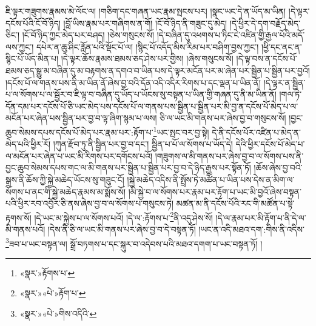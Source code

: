 ཇི་ལྟར་གཟུགས་རྣམས་མེ་ལོང་ལ། །གཅིག་དང་གཞན་ཡང་རྣམ་སྤངས་པར། །སྣང་ཡང་དེ་ན་ཡོད་མ་ཡིན། །དེ་ལྟར་དངོས་པོའི་ངོ་བོ་ཉིད། །བློ་ཡིས་རྣམ་པར་གཞིགས་ན་གོ། །ངོ་བོ་ཉིད་ནི་གཟུང་དུ་མེད། །དེ་ཕྱིར་དེ་དག་བརྗོད་མེད་ཅིང་། །ངོ་བོ་ཉིད་ཀྱང་མེད་པར་བཤད། །ཅེས་གསུངས་སོ། །དེ་བཞིན་དུ་འཕགས་པ་ཏིང་ངེ་འཛིན་གྱི་རྒྱལ་པོའི་མདོ་ལས་ཀྱང་། དཔེར་ན་ཆུ་ཤིང་རློན་པའི་སྡོང་པོ་ལ། །སྙིང་པོ་འདོད་མིས་རིམ་པར་བཤིག་བྱས་ཀྱང་། །ཕྱི་དང་ནང་ན་སྙིང་པོ་ཡོད་མིན་པ། །དེ་ལྟར་ཆོས་རྣམས་ཐམས་ཅད་ཤེས་པར་གྱིས། །ཞེས་གསུངས་སོ། །དེ་ལྟ་བས་ན་དངོས་པོ་ཐམས་ཅད་སྒྱུ་མ་བཞིན་དུ་མ་བརྟགས་ན་དགའ་བ་ཡིན་པས་དེ་ལྟར་མངོན་པར་མ་ཞེན་པར་སྦྱིན་པ་སྦྱིན་པར་བྱའོ། །དངོས་པོ་ལ་གནས་པས་ནི་མ་ཡིན་ནོ་ཞེས་བྱ་བའི་དོན་འདི་འདིར་རིགས་པ་དང་ལྡན་པ་ཡིན་ནོ། །དེ་ལྟར་ན་སྦྱིན་པ་ལ་སོགས་པ་ལ་སྦྱོར་བ་ཇི་ལྟ་བ་བཞིན་དུ་ཡོད་པ་ཡོངས་སུ་བསྟན་པ་ཡིན་གྱི་གཞན་དུ་ནི་མ་ཡིན་ནོ། །གལ་ཏེ་དོན་དམ་པར་དངོས་པོ་ཅི་ཡང་མེད་པས་དངོས་པོ་ལ་གནས་པས་སྦྱིན་པ་སྦྱིན་པར་མི་བྱ་ན་དངོས་པོ་མེད་པ་ལ་མངོན་པར་ཞེན་པས་སྦྱིན་པར་བྱ་བ་ལྟ་ཞིག་སྙམ་པ་ལས། ཅི་ལ་ཡང་མི་གནས་པར་ཞེས་བྱ་བ་གསུངས་སོ། །བྱང་ཆུབ་སེམས་དཔས་དངོས་པོ་མེད་པར་རྣམ་པར་:རྟོག་པ་\footnote{«སྣར་»རྟོགས་པ་}ཡང་སྤང་བར་བྱ་སྟེ། དེ་ནི་དངོས་པོར་འཛིན་པ་མེད་ན་མེད་པའི་ཕྱིར་རོ། །ཀུན་རྫོབ་ཏུ་ནི་སྦྱིན་པར་བྱ་བ་དང་། སྦྱིན་པ་པོ་ལ་སོགས་པ་ཡོད་དེ། དེའི་ཕྱིར་དངོས་པོ་མེད་པ་ལ་མངོན་པར་ཞེན་པ་ཡང་མི་རིགས་པར་དགོངས་པའོ། །གཟུགས་ལ་མི་གནས་པར་ཞེས་བྱ་བ་ལ་སོགས་པས་ནི་བྱང་ཆུབ་སེམས་དཔས་གང་ལ་མི་གནས་པར་སྦྱིན་པ་སྦྱིན་པར་བྱ་བ་དེ་ཉིད་རྒྱས་པར་སྟོན་ཏོ། །ཆོས་ཞེས་བྱ་བའི་སྒྲས་ནི་ཆོས་ཀྱི་སྐྱེ་མཆེད་ཡོངས་སུ་གཟུང་ངོ། །སྐྱེ་མཆེད་འདིས་ནི་སྤྲོས་ཏེ་མཚོན་པ་ཡིན་པས་དེས་ན་མིག་ལ་སོགས་པ་ནང་གི་སྐྱེ་མཆེད་རྣམས་མ་སྨོས་སོ། །མི་སྐྱེ་བ་ལ་སོགས་པར་རྣམ་པར་རྟོག་པ་ཡང་མི་བྱའོ་ཞེས་བསྟན་པའི་ཕྱིར་རབ་འབྱོར་ཅི་ནས་ཞེས་བྱ་བ་ལ་སོགས་པ་གསུངས་ཏེ། མཚན་མ་ནི་དངོས་པོའི་རང་གི་མཚོན་པ་སྟེ་རྟགས་སོ། །དེ་ཡང་མ་སྐྱེས་པ་ལ་སོགས་པའོ། །དེ་ལ་:རྟོགས་པ་\footnote{«སྣར་»«པེ་»རྟོག་པ་}ནི་འདུ་ཤེས་སོ། །དེ་ལ་རྣམ་པར་མི་རྟོག་པ་ནི་དེ་ལ་མི་གནས་པའོ། །དེས་ནི་ཅི་ལ་ཡང་མི་གནས་པར་ཞེས་བྱ་བ་དེ་བསྟན་ཏོ། །ཡང་ན་འདི་མཐའ་དག་:གིས་ནི་འདིས་\footnote{«སྣར་»«པེ་»གིས་འདིའི་}ཟབ་པ་ཡང་བསྟན་ལ། སྒྲོ་བཏགས་པ་དང་སྐུར་བ་འདེབས་པའི་མཐའ་དགག་པ་ཡང་བསྟན་ཏོ། །
